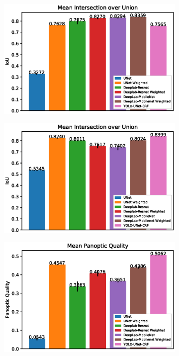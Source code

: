 \documentclass[10pt, journal, compsoc]{IEEEtran}
\begin{document}
\begin{figure}
\centering
\begin{subfigure}[b]{0.49\linewidth}
\includegraphics[width=\linewidth]{graphs/Mean-Intersection-over-Union-(Neuroblastoma).eps}
\end{subfigure}
\begin{subfigure}[b]{0.49\linewidth}
\includegraphics[width=\linewidth]{graphs/Mean-Intersection-over-Union-(C127).eps}
\end{subfigure}
\begin{subfigure}[b]{0.49\linewidth}
\includegraphics[width=\linewidth]{graphs/Mean-Panoptic-Quality-(Neuroblastoma).eps}

\end{subfigure}
\end{figure}
\end{document}
